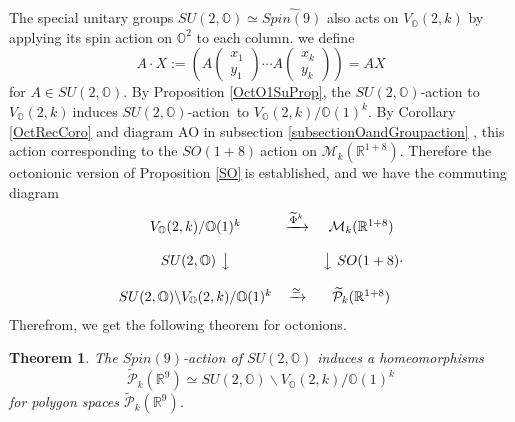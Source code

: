 \documentclass[a4paper]{article}%
\newtheorem{theorem}{Theorem}
\begin{document}
The special unitary groups $SU(2,\mathbb{O})\simeq\widehat{Spin(9)}$ also acts
on $V_{\mathbb{O}}(2,k)$ by applying its spin action on $\mathbb{O}^{2}$ to
each column. we define
\[
A\cdot X:=\left(  A%
\begin{pmatrix}
x_{1}\\
y_{1}%
\end{pmatrix}
\cdots A%
\begin{pmatrix}
x_{k}\\
y_{k}%
\end{pmatrix}
\right)  =AX
\]
for $A\in SU(2,\mathbb{O})$. By Proposition \ref{OctO1SuProp}, the
$SU(2,\mathbb{O})$-action to $V_{\mathbb{O}}(2,k)\ $induces $SU(2,\mathbb{O}%
)$-action\ to $V_{\mathbb{O}}(2,k)/\mathbb{O}(1)^{k}$. By Corollary
\ref{OctRecCoro} and diagram AO in subsection \ref{subsectionOandGroupaction}%
\thinspace, this action corresponding to the $SO(1+8)\ $action on
$\mathcal{M}_{k}(\mathbb{R}^{1+8})$. Therefore the octonionic version of
Proposition \ref{SO}$~$is established, and we have the commuting diagram
\[%
\begin{matrix}
V_{\mathbb{O}}(2,k)/\mathbb{O}(1)^{k} & \xrightarrow{ \widetilde{\Phi}^k} &
\mathcal{M}_{k}(\mathbb{R}^{1+8})\\
&  & \\
SU(2,\mathbb{O})\ \big\downarrow &  & \big\downarrow\ SO(1+8)\\
&  & \\
SU(2,\mathbb{O})\backslash V_{\mathbb{O}}(2,k)/\mathbb{O}(1)^{k} &
\xrightarrow{\simeq} & \widetilde{\mathcal{P}}_{k}(\mathbb{R}^{1+8})
\end{matrix}
.
\]
Therefrom, we get the following theorem for octonions.

\begin{theorem}
\label{thm2} The $Spin(9)$-action of $SU(2,\mathbb{O})$ induces a
homeomorphisms
\[
\widetilde{\mathcal{P}}_{k}(\mathbb{R}^{9})\simeq SU(2,\mathbb{O})\backslash
V_{\mathbb{O}}(2,k)/\mathbb{O}(1)^{k}%
\]
for polygon spaces $\widetilde{\mathcal{P}}_{k}(\mathbb{R}^{9})$.
\end{theorem}
\end{document}
